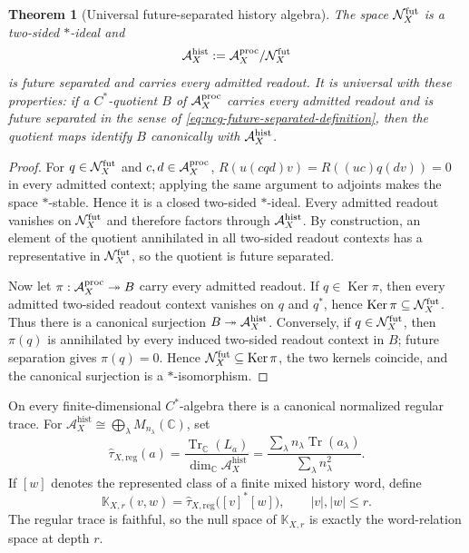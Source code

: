 \documentclass[11pt]{article}
\newtheorem{theorem}{Theorem}[section]
\theoremstyle{definition}
\theoremstyle{remark}
\theoremstyle{definition}
\theoremstyle{remark}
\newcommand{\C}{\mathbb C}
\newcommand{\Tr}{\operatorname{Tr}}
\newcommand{\Ker}{\operatorname{Ker}}
\newcommand{\A}{\mathcal A}
\begin{document}
\begin{theorem}[Universal future-separated history algebra]
\label{thm:ncg-contextual-envelope}
The space $\mathcal N_X^{\rm fut}$ is a two-sided $*$-ideal and
\begin{equation}
 \A_X^{\mathrm{hist}}
 :=\A_X^{\rm proc}/\mathcal N_X^{\rm fut}
 \label{eq:ncg-history-algebra}
\end{equation}
is future separated and carries every admitted readout.  It is universal with these
properties: if a $C^*$-quotient $B$ of $\A_X^{\rm proc}$ carries every admitted
readout and is future separated in the sense of
\eqref{eq:ncg-future-separated-definition}, then the quotient maps identify
$B$ canonically with $\A_X^{\rm hist}$.
\end{theorem}

\begin{proof}
For $q\in\mathcal N_X^{\rm fut}$ and $c,d\in\A_X^{\rm proc}$,
$R(u(cqd)v)=R((uc)q(dv))=0$ in every admitted context; applying the same argument
to adjoints makes the space $*$-stable.  Hence it is a closed two-sided $*$-ideal.
Every admitted readout vanishes on $\mathcal N_X^{\rm fut}$ and therefore factors
through $\A_X^{\rm hist}$.  By construction, an element of the quotient annihilated
in all two-sided readout contexts has a representative in $\mathcal N_X^{\rm fut}$,
so the quotient is future separated.

Now let $\pi:\A_X^{\rm proc}\twoheadrightarrow B$ carry every admitted readout.  If
$q\in\Ker\pi$, then every admitted two-sided readout context vanishes on $q$ and
$q^*$, hence $\Ker\pi\subseteq\mathcal N_X^{\rm fut}$.  Thus there is a canonical
surjection $B\twoheadrightarrow\A_X^{\rm hist}$.  Conversely, if
$q\in\mathcal N_X^{\rm fut}$, then $\pi(q)$ is annihilated by every induced
two-sided readout context in $B$; future separation gives $\pi(q)=0$.  Hence
$\mathcal N_X^{\rm fut}\subseteq\Ker\pi$, the two kernels coincide, and the
canonical surjection is a $*$-isomorphism.
\end{proof}

On every finite-dimensional $C^*$-algebra there is a canonical normalized regular
trace.  For
$\A_X^{\mathrm{hist}}\cong\bigoplus_\lambda M_{n_\lambda}(\C)$, set
\begin{equation}
 \widehat\tau_{X,\mathrm{reg}}(a)
 =\frac{\Tr_{\C}(L_a)}{\dim_{\C}\A_X^{\mathrm{hist}}}
 =\frac{\sum_\lambda n_\lambda\Tr(a_\lambda)}
        {\sum_\lambda n_\lambda^2}.
\label{eq:ncg-grand-regular-trace}
\end{equation}
If $[w]$ denotes the represented class of a finite mixed history word, define
\begin{equation}
 \mathbb K_{X,r}(v,w)
 =\widehat\tau_{X,\mathrm{reg}}\bigl([v]^*[w]\bigr),
 \qquad |v|,|w|\le r.
\label{eq:ncg-word-gram}
\end{equation}
The regular trace is faithful, so the null space of $\mathbb K_{X,r}$ is exactly
the word-relation space at depth $r$.
\end{document}
